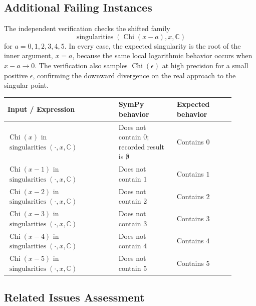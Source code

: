 \documentclass[11pt]{article}
\begin{document}
\subsection{Additional Failing Instances}

The independent verification checks the shifted family
\[
\operatorname{singularities}(\operatorname{Chi}(x-a), x, \mathbb{C})
\]
for \(a=0,1,2,3,4,5\). In every case, the expected singularity is the root of
the inner argument, \(x=a\), because the same local logarithmic behavior occurs
when \(x-a\to 0\). The verification also samples \(\operatorname{Chi}(\epsilon)\)
at high precision for a small positive \(\epsilon\), confirming the downward
divergence on the real approach to the singular point.

\begin{center}
\small
\renewcommand{\arraystretch}{1.3}
\begin{tabular}{@{}>{\raggedright\arraybackslash}p{0.44\linewidth}>{\raggedright\arraybackslash}p{0.23\linewidth}>{\raggedright\arraybackslash}p{0.23\linewidth}@{}}
\toprule
\textbf{Input / Expression} & \textbf{SymPy behavior} & \textbf{Expected behavior} \\
\midrule
\(\operatorname{Chi}(x)\) in \(\operatorname{singularities}(\cdot,x,\mathbb{C})\) & Does not contain \(0\); recorded result is \(\emptyset\) & Contains \(0\) \\
\(\operatorname{Chi}(x-1)\) in \(\operatorname{singularities}(\cdot,x,\mathbb{C})\) & Does not contain \(1\) & Contains \(1\) \\
\(\operatorname{Chi}(x-2)\) in \(\operatorname{singularities}(\cdot,x,\mathbb{C})\) & Does not contain \(2\) & Contains \(2\) \\
\(\operatorname{Chi}(x-3)\) in \(\operatorname{singularities}(\cdot,x,\mathbb{C})\) & Does not contain \(3\) & Contains \(3\) \\
\(\operatorname{Chi}(x-4)\) in \(\operatorname{singularities}(\cdot,x,\mathbb{C})\) & Does not contain \(4\) & Contains \(4\) \\
\(\operatorname{Chi}(x-5)\) in \(\operatorname{singularities}(\cdot,x,\mathbb{C})\) & Does not contain \(5\) & Contains \(5\) \\
\bottomrule
\end{tabular}
\end{center}

\subsection{Related Issues Assessment}
\end{document}
